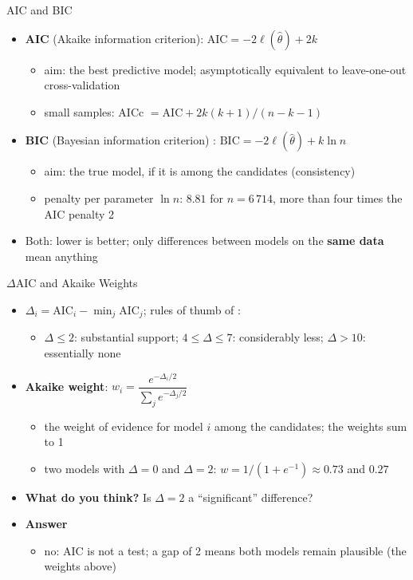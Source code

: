 \begin{frame}{AIC and BIC}
\itemsize{\small}
\begin{itemize}
    \item \textbf{AIC} (Akaike information criterion): $\mathrm{AIC} = -2\ell(\hat\theta) + 2k$
    \begin{itemize}
        \item aim: the best predictive model; asymptotically equivalent to leave-one-out cross-validation 
        \item small samples: AICc $= \mathrm{AIC} + 2k(k+1)/(n - k - 1)$ 
    \end{itemize}
    \item \textbf{BIC} (Bayesian information criterion) : $\mathrm{BIC} = -2\ell(\hat\theta) + k\ln n$
    \begin{itemize}
        \item aim: the true model, if it is among the candidates (consistency)
        \item penalty per parameter $\ln n$: $8.81$ for $n = 6\,714$, more than four times the AIC penalty 2
    \end{itemize}
    \item Both: lower is better; only differences between models on the \textbf{same data} mean anything
\end{itemize}
\end{frame}

\begin{frame}{$\Delta$AIC and Akaike Weights}
\itemsize{\small}
\begin{itemize}
    \item $\Delta_i = \mathrm{AIC}_i - \min_j \mathrm{AIC}_j$; rules of thumb of :
    \begin{itemize}
        \item $\Delta \le 2$: substantial support; $4 \le \Delta \le 7$: considerably less; $\Delta > 10$: essentially none
    \end{itemize}
    \item \textbf{Akaike weight}: $w_i = \dfrac{e^{-\Delta_i/2}}{\sum_j e^{-\Delta_j/2}}$
    \begin{itemize}
        \item the weight of evidence for model $i$ among the candidates; the weights sum to 1
        \item two models with $\Delta = 0$ and $\Delta = 2$: $w = 1/(1 + e^{-1}) \approx 0.73$ and $0.27$
    \end{itemize}
    \item \textbf{What do you think?} Is $\Delta = 2$ a ``significant'' difference?
    \item \textbf{Answer}
    \begin{itemize}
        \item no: AIC is not a test; a gap of 2 means both models remain plausible (the weights above)
    \end{itemize}
\end{itemize}
\end{frame}


